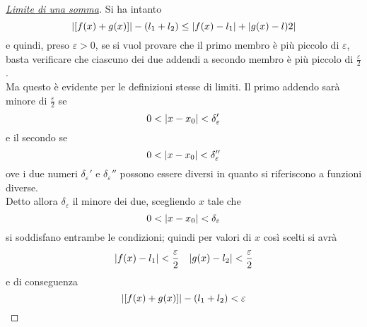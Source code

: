 \begin{proof}[\protect\hyperlink{teor:sommaLimiti}{Limite di una somma}]
  Si ha intanto
  \begin{equation*}
    \lvert[f(x)+g(x)]\rvert-(l_1+l_2)\leq\lvert f(x)-l_1\rvert+\lvert g(x)-l)2\rvert
  \end{equation*}
  e quindi, preso $\varepsilon>0$, se si vuol provare che il primo membro è più piccolo di 
  $\varepsilon$, basta verificare che ciascuno dei due addendi a secondo membro è più piccolo di
  $\frac{\varepsilon}{2}$.\\
  Ma questo è evidente per le definizioni stesse di limiti. Il primo addendo sarà minore di 
  $\frac{\varepsilon}{2}$ se
  \begin{equation*}
    0<\lvert x-x_0\rvert<\delta_\varepsilon'
  \end{equation*}
  e il secondo se
  \begin{equation*}
    0<\lvert x-x_0\rvert<\delta_\varepsilon''
  \end{equation*}
  ove i due numeri $\delta_\varepsilon'$ e $\delta_\varepsilon''$ possono essere diversi in quanto 
  si riferiscono a funzioni diverse.\\
  Detto allora $\delta_\varepsilon$ il minore dei due, scegliendo $x$ tale che
  \begin{equation*}
    0<\lvert x-x_0\rvert<\delta_\varepsilon
  \end{equation*}
  si soddisfano entrambe le condizioni; quindi per valori di $x$ così scelti si avrà
  \begin{equation*}
    \lvert f(x)-l_1\rvert<\frac{\varepsilon}{2}\quad\lvert g(x)-l_2\rvert<\frac{\varepsilon}{2}
  \end{equation*}
  e di conseguenza
  \begin{equation*}
    \lvert[f(x)+g(x)]\rvert-(l_1+l_2)<\varepsilon
  \end{equation*}
\end{proof}


